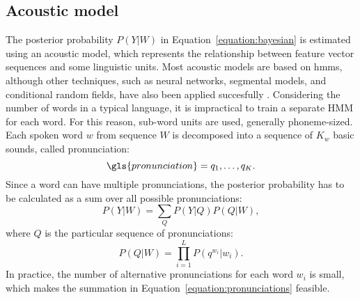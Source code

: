 \subsection{Acoustic model}
\label{subsection:acoustic}
The posterior probability $P(Y|W)$ in Equation~\ref{equation:bayesian} is estimated using an acoustic model, which represents the relationship between feature vector sequences and some linguistic units. Most acoustic models are based on \glspl{hmm}, although other techniques, such as neural networks, segmental models, and conditional random fields, have also been applied succesfully \cite{yu2009hidden, yu2008maximum, mohamed2012acoustic}. Considering the number of words in a typical language, it is impractical to train a separate HMM for each word. For this reason, sub-word units are used, generally phoneme-sized. Each spoken word $w$ from sequence $W$ is decomposed into a sequence of $K_{w}$ basic sounds, called pronunciation:
\begin{equation}
  \gls{pronunciation}=q_{1}, \ldots, q_{K}.
\end{equation}
Since a word can have multiple pronunciations, the posterior probability has to be calculated as a sum over all possible pronunciations:
\begin{equation}
  \label{equation:pronunciations}
  P(Y|W) = \sum_{Q}P(Y|Q)P(Q|W),
\end{equation}
where $Q$ is the particular sequence of pronunciations:
\begin{equation}
  P(Q|W)=\prod_{i=1}^{L}P(q^{w_{i}}|w_{i}).
\end{equation}
In practice, the number of alternative pronunciations for each word $w_{i}$ is small, which makes the summation in Equation~\ref{equation:pronunciations} feasible.



